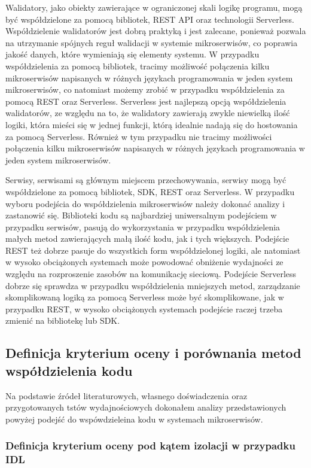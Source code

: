 \documentclass[runningheads,12pt]{llncs}
\begin{document}
Walidatory, jako obiekty zawierające w ograniczonej skali logikę programu, mogą być współdzielone za pomocą bibliotek, REST API oraz technologii Serverless. Współdzielenie walidatorów jest dobrą praktyką i jest zalecane, ponieważ pozwala na utrzymanie spójnych reguł walidacji w systemie mikroserwisów, co poprawia jakość danych, które wymieniają się elementy systemu. W przypadku współdzielenia za pomocą bibliotek, tracimy możliwość połączenia kilku mikroserwisów napisanych w różnych językach programowania w jeden system mikroserwisów, co natomiast możemy zrobić w przypadku współdzielenia za pomocą REST oraz Serverless. Serverless jest najlepszą opcją współdzielenia walidatorów, ze względu na to, że walidatory zawierają zwykle niewielką ilość logiki, która mieści się w jednej funkcji, którą idealnie nadają się do hostowania za pomocą Serverless. Również w tym przypadku nie tracimy możliwości połączenia kilku mikroserwisów napisanych w różnych językach programowania w jeden system mikroserwisów.

Serwisy, serwisami są głównym miejscem przechowywania, serwisy mogą być współdzielone za pomocą bibliotek, SDK, REST oraz Serverless. W przypadku wyboru podejścia do współdzielenia mikroserwisów należy dokonać analizy i zastanowić się. Biblioteki kodu są najbardziej uniwersalnym podejściem w przypadku serwisów, pasują do wykorzystania w przypadku współdzielenia małych metod zawierających małą ilość kodu, jak i tych większych. Podejście REST też dobrze pasuje do wszystkich form współdzielonej logiki, ale natomiast w wysoko obciążonych systemach może powodować obniżenie wydajności ze względu na rozproszenie zasobów na komunikację sieciową. Podejście Serverless dobrze się sprawdza w przypadku współdzielenia mniejszych metod, zarządzanie skomplikowaną logiką za pomocą Serverless może być skomplikowane, jak w przypadku REST, w wysoko obciążonych systemach podejście raczej trzeba zmienić na bibliotekę lub SDK.

\subsection{Definicja kryterium oceny i porównania metod współdzielenia kodu}

Na podstawie źródeł literaturowych, własnego doświadczenia oraz przygotowanych tstów wydajnościowych dokonałem analizy przedstawionych powyżej podejść do wspówdzieleina kodu w systemach mikroserwisów.

\subsubsection{Definicja kryterium oceny pod kątem izolacji w przypadku IDL}
\end{document}
